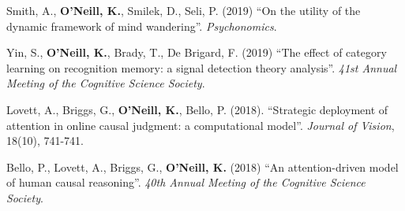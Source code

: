 Smith, A., \textbf{O'Neill, K.}, Smilek, D., Seli, P. (2019) ``On the
utility of the dynamic framework of mind
wandering''. \emph{Psychonomics}.

Yin, S., \textbf{O'Neill, K.}, Brady, T., De Brigard, F. (2019) ``The
effect of category learning on recognition memory: a signal detection
theory analysis''. \emph{41st Annual Meeting of the Cognitive Science
Society}.

Lovett, A., Briggs, G., \textbf{O'Neill, K.}, Bello,
P. (2018). ``Strategic deployment of attention in online causal
judgment: a computational model''. \emph{Journal of Vision}, 18(10),
741-741.

Bello, P., Lovett, A., Briggs, G., \textbf{O'Neill, K.} (2018) ``An
attention-driven model of human causal reasoning''. \emph{40th Annual
Meeting of the Cognitive Science Society}.
